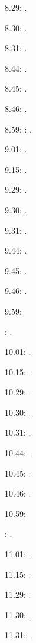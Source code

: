 \documentclass[italian]{article}
\begin{document}
8.29:   . 

8.30:   .

8.31:   .

8.44:   .

8.45:   .

8.46:   .

8.59:   
:  .

9.01:   . 

9.15:   . 

9.29:   . 

9.30:   .

9.31:   .

9.44:   .

9.45:   .

9.46:   .

9.59:   

:  .

10.01:   . 

10.15:   . 

10.29:   . 

10.30:   .

10.31:   .

10.44:   .

10.45:   .

10.46:   .

10.59:   

:  .

11.01:   . 

11.15:   . 

11.29:   . 

11.30:   .

11.31:   .
\end{document}
